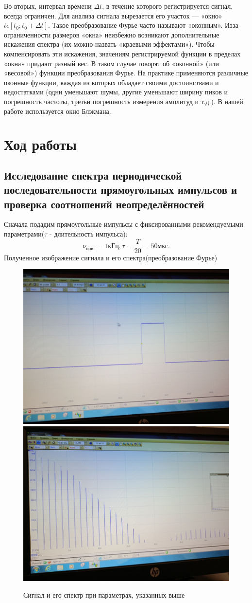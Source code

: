 \documentclass[a4paper,12pt]{article}
\begin{document}
Во-вторых, интервал времени $\Delta t$, в течение которого регистрируется сигнал, всегда ограничен. Для анализа сигнала вырезается его участок — «окно»
$t \epsilon [t_0; t_0 + \Delta t]$. Такое преобразование Фурье часто называют «оконным». Изза ограниченности размеров «окна» неизбежно возникают дополнительные искажения спектра (их можно назвать «краевыми эффектами»). Чтобы компенсировать эти искажения, значениям регистрируемой функции в пределах
«окна» придают разный вес. В таком случае говорят об «оконной» (или «весовой») функции преобразования Фурье. На практике применяются различные оконные функции, каждая из которых обладает своими достоинствами и недостатками (одни уменьшают шумы, другие уменьшают ширину пиков и погрешность частоты, третьи погрешность измерения амплитуд и т.д.). В нашей
работе используется окно Блэкмана.

\section*{Ход работы}
\subsection*{Исследование спектра периодической последовательности прямоугольных импульсов и проверка соотношений неопределённостей}
Сначала подадим прямоугольные импульсы с фиксированными рекомендуемыми параметрами($\tau$ - длительность импульса):
\[\nu_{\text{повт}} = 1 \text{кГц}, \tau = \frac{T}{20} = 50 \text{мкс}.\]
Полученное изображение сигнала и его спектра(преобразование Фурье)

\begin{figure}[H]
    \includegraphics[width=.5\textwidth]{A.6.1.graph}
    \includegraphics[width=.5\textwidth]{A.6.1.spectr}
    \caption{Сигнал и его спектр при параметрах, указанных выше}\label{fig:foobar}
\end{figure}
\end{document}
